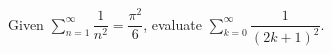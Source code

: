 Given $\displaystyle\sum_{n=1}^{\infty}\dfrac{1}{n^2}=\dfrac{\pi^2}{6}$, evaluate $\displaystyle\sum_{k=0}^{\infty}\dfrac{1}{(2k+1)^2}$.
